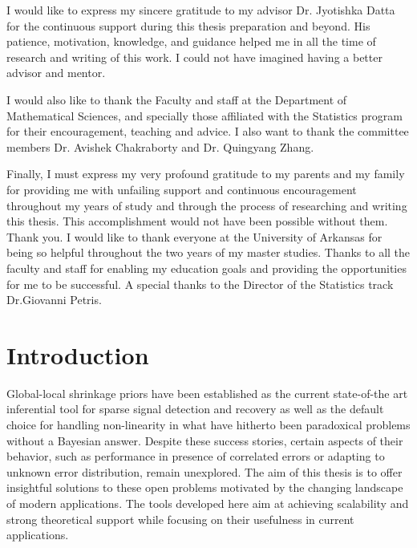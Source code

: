 \documentclass[chapters]{uamaththesis}
\begin{document}
\begin{acknowledgements}

I would like to express my sincere gratitude to my advisor Dr. Jyotishka Datta for the continuous support during this thesis preparation and beyond. His patience, motivation, knowledge, and guidance helped me in all the time of research and writing of this work. I could not have imagined having a better advisor and mentor.


I would also like to thank the Faculty and staff at the Department of Mathematical Sciences, and specially those affiliated with the Statistics program for their encouragement, teaching and advice. I also want to thank the committee members Dr. Avishek Chakraborty and Dr. Quingyang Zhang.


Finally, I must express my very profound gratitude to my parents and my family for providing me with unfailing support and continuous encouragement throughout my years of study and through the process of researching and writing this thesis. This accomplishment would not have been possible without them. Thank you.
I would like to thank everyone at the University of Arkansas for being so
helpful throughout the two years of my master studies. Thanks to
all the faculty and staff for enabling my education goals and providing
the opportunities for me to be successful. A special thanks to the Director of the Statistics track Dr.Giovanni Petris.
\end{acknowledgements}



\tableofcontents

\mainmatter%



\chapter{Introduction}

Global-local shrinkage priors have been established as the current state-of-the art inferential tool for sparse signal detection and recovery as well as the default choice for handling non-linearity in what have hitherto been paradoxical problems without a Bayesian answer. Despite these success stories, certain aspects of their behavior, such as performance in presence of correlated errors or adapting to unknown error distribution, remain unexplored. The aim of this thesis is to offer insightful solutions to these open problems motivated by the changing landscape of modern applications. The tools developed here aim at achieving scalability and strong theoretical support while focusing on their usefulness in current applications. 
\end{document}
